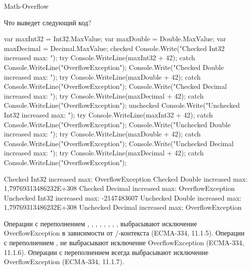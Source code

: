 \begin{defproblem}{Math-Overflow}
\begin{onlyproblem}
  Что выведет следующий код?
  \begin{source}
  var maxInt32 = Int32.MaxValue;
  var maxDouble = Double.MaxValue;
  var maxDecimal = Decimal.MaxValue;
  checked
  {
    Console.Write("Checked   Int32   increased max: ");
    try { Console.WriteLine(maxInt32 + 42); }
    catch { Console.WriteLine("OverflowException"); }
    Console.Write("Checked   Double  increased max: ");
    try { Console.WriteLine(maxDouble + 42); }
    catch { Console.WriteLine("OverflowException"); }
    Console.Write("Checked   Decimal increased max: ");
    try { Console.WriteLine(maxDecimal + 42); }
    catch { Console.WriteLine("OverflowException"); }
  }
  unchecked
  {
    Console.Write("Unchecked Int32   increased max: ");
    try { Console.WriteLine(maxInt32 + 42); }
    catch { Console.WriteLine("OverflowException"); }
    Console.Write("Unchecked Double  increased max: ");
    try { Console.WriteLine(maxDouble + 42); }
    catch { Console.WriteLine("OverflowException"); }
    Console.Write("Unchecked Decimal increased max: ");
    try { Console.WriteLine(maxDecimal + 42); }
    catch { Console.WriteLine("OverflowException"); }
  }
  \end{source}
\end{onlyproblem}
\begin{onlysolution}
  \begin{source}
  Checked   Int32   increased max: OverflowException
  Checked   Double  increased max: 1,79769313486232E+308
  Checked   Decimal increased max: OverflowException
  Unchecked Int32   increased max: -2147483607
  Unchecked Double  increased max: 1,79769313486232E+308
  Unchecked Decimal increased max: OverflowException
  \end{source}
  Операции с переполнением , , , , , , , ,  выбрасывают исключение OverflowException в зависимости от /-контекста (ECMA-334, 11.1.5).
  Операции с переполнением ,  не выбрасывают исключение OverflowException (ECMA-334, 11.1.6).
  Операции с переполнением  всегда выбрасывают исключение OverflowException (ECMA-334, 11.1.7).
\end{onlysolution}
\end{defproblem}
